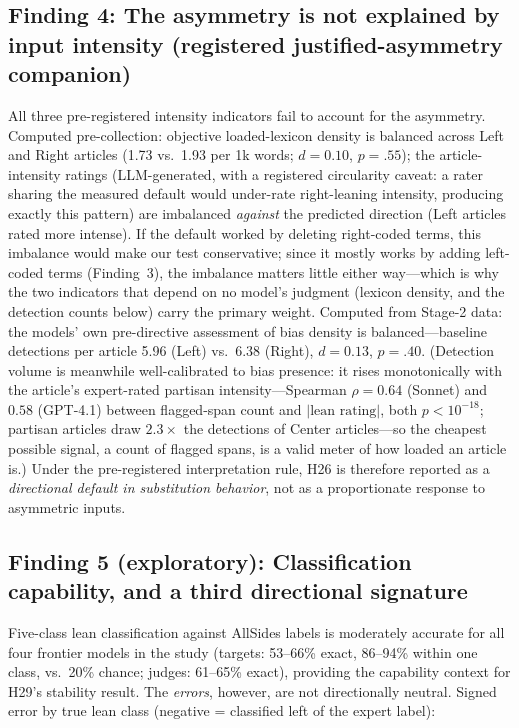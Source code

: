 \documentclass{article}
\begin{document}
\subsection{Finding 4: The asymmetry is not explained by input intensity (registered justified-asymmetry companion)}
All three pre-registered intensity indicators fail to account for the
asymmetry. Computed pre-collection: objective loaded-lexicon density is
balanced across Left and Right articles (1.73 vs.\ 1.93 per 1k words;
$d{=}0.10$, $p{=}.55$); the article-intensity ratings (LLM-generated,
with a registered circularity caveat: a rater sharing the measured
default would under-rate right-leaning intensity, producing exactly
this pattern) are imbalanced \emph{against} the predicted direction
(Left articles rated more intense). If the default worked by deleting right-coded terms, this imbalance
would make our test conservative; since it mostly works by adding
left-coded terms (Finding~3), the imbalance matters little either
way---which is why the two indicators that depend on no model's
judgment (lexicon density, and the detection counts below) carry the
primary weight. Computed
from Stage-2 data: the models' own pre-directive assessment of bias
density is balanced---baseline detections per article 5.96 (Left) vs.\
6.38 (Right), $d{=}0.13$, $p{=}.40$. (Detection volume is meanwhile
well-calibrated to bias presence: it rises monotonically with the
article's expert-rated partisan intensity---Spearman $\rho{=}0.64$
(Sonnet) and $0.58$ (GPT-4.1) between flagged-span count and
$|\text{lean rating}|$, both $p{<}10^{-18}$; partisan articles draw
$2.3\times$ the detections of Center articles---so the cheapest possible
signal, a count of flagged spans, is a valid meter of how loaded an
article is.) Under the pre-registered interpretation rule,
H26 is therefore reported as a \emph{directional default in substitution
behavior}, not as a proportionate response to asymmetric inputs.

\subsection{Finding 5 (exploratory): Classification capability, and a
third directional signature}
\label{sec:capability}
Five-class lean classification against AllSides labels is moderately
accurate for all four frontier models in the study (targets: 53--66\%
exact, 86--94\% within one class, vs.\ 20\% chance; judges: 61--65\%
exact), providing the capability context for H29's stability result. The
\emph{errors}, however, are not directionally neutral. Signed error by
true lean class (negative = classified left of the expert label):
\end{document}
